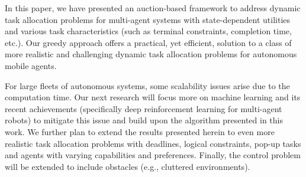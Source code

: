 \documentclass{ifacconf}
\begin{document}
In this paper, we have presented an auction-based framework to address dynamic task allocation problems for multi-agent systems
with state-dependent utilities and various task characteristics (such  as terminal constraints, completion time, etc.). Our greedy approach offers a practical, yet efficient, solution to a class of more realistic and challenging dynamic task allocation problems for autonomous mobile agents.

For large fleets of autonomous systems, some scalability issues arise due to the computation time. Our next research will focus more on machine learning and its recent achievements (specifically deep reinforcement learning for multi-agent robots) to mitigate this issue and build upon the algorithm presented in this work. We further plan to extend the results presented herein to even more realistic task allocation problems with deadlines, logical constraints, pop-up tasks and agents with varying capabilities and preferences. Finally, the control problem will be extended to include obstacles (e.g., cluttered environments).


\end{document}
